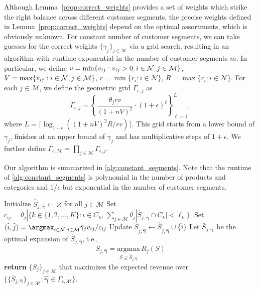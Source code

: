 \documentclass[msom,non-blindrev]{informs3} %
\theoremstyle{definition}
\begin{document}
Although Lemma~\ref{prop:correct_weights} provides a set of weights  which strike the right balance across different customer segments, the precise weights defined in Lemma~\ref{prop:correct_weights} depend on the optimal assortments, which is obviously unknown. For constant number of customer segments, we can take guesses for the correct weights $\{\gamma_j\}_{j\in\mathcal{M}}$ via a grid search, resulting in an algorithm with runtime exponential in the number of customer segments $m$. In particular, we define $v=\min\{v_{ij}:v_{ij}>0, i \in {\cal N}, j \in {\cal M}\}$, $V=\max\{v_{ij}: i \in {\cal N}, j \in {\cal M}\}$, $r=\min\{r_i:i\in\mathcal{N}\}$, $R=\max\{r_i:i\in\mathcal{N}\}$. For each $j\in\mathcal{M}$, we define the geometric grid $\Gamma_{\epsilon,j}$ as
\begin{equation*}
\Gamma_{\epsilon,j}=\left\{\dfrac{\theta_jr v}{(1+nV)^2}\cdot (1+\epsilon)^\ell\right\}_{\ell=1}^L,
\end{equation*}
where $L=\lceil \log_{1+\epsilon}((1+nV)^2R/rv)\rceil$. This grid starts from a lower bound of $\gamma_j$, finishes at an upper bound of $\gamma_j$ and has multiplicative steps of $1+\epsilon$.
We further define $\Gamma_{\epsilon,\mathcal{M}}=\prod_{j\in\mathcal{M}}\Gamma_{\epsilon,j}$.

Our algorithm is summarized in \cref{alg:constant_segments}. Note that the runtime of \cref{alg:constant_segments} is polynomial in the number of products and categories and $1/\epsilon$ but exponential in the number of customer segments.

\begin{algorithm}[!ht]
\caption{Multi-segment assortment optimization with constant number of segments}
\SingleSpacedXI
\label{alg:constant_segments}
\begin{algorithmic}
\State Initialize $\hat{S}_{j,\hat{\boldsymbol{\gamma}}}\leftarrow \varnothing$ for all $j\in\mathcal{M}$
\State Set $c_{ij}=\theta_j|\{k\in\{1,2,\dots,K\}:i\in C_k,\,\sum_{j\in\mathcal{M}}\theta_j|\hat{S}_{j,\hat{\boldsymbol{\gamma}}}\cap C_k|<\ell_k\}|$
\State Set $(\hat{i},\hat{j})=\argmax_{i\in\mathcal{N},j\in\mathcal{M}}\hat{\gamma}_jv_{ij}/c_{ij}$
\State Update $\hat{S}_{\hat{j},\hat{\boldsymbol{\gamma}}}\leftarrow \hat{S}_{\hat{j},\hat{\boldsymbol{\gamma}}}\cup\{\hat{i}\}$
\EndWhile
\State Let $\bar{S}_{j,\hat{\boldsymbol{\gamma}}}$ be the optimal expansion of $\hat{S}_{j,\hat{\boldsymbol{\gamma}}}$, i.e.,
\begin{equation*}
\bar{S}_{j,\hat{\boldsymbol{\gamma}}}=\underset{S\supseteq \hat{S}_{j,\hat{\boldsymbol{\gamma}}}}{\mathrm{argmax}}\,R_j(S)
\end{equation*}
\EndFor
\State \textbf{return} $\{S_j\}_{j\in\mathcal{M}}$ that maximizes the expected revenue over $\{\{\bar{S}_{j,\hat{\boldsymbol{\gamma}}}\}_{j\in\mathcal{M}}:\hat{\boldsymbol{\gamma}}\in\Gamma_{\epsilon,\mathcal{M}}\}$.
\end{algorithmic}
\end{algorithm}
\end{document}

